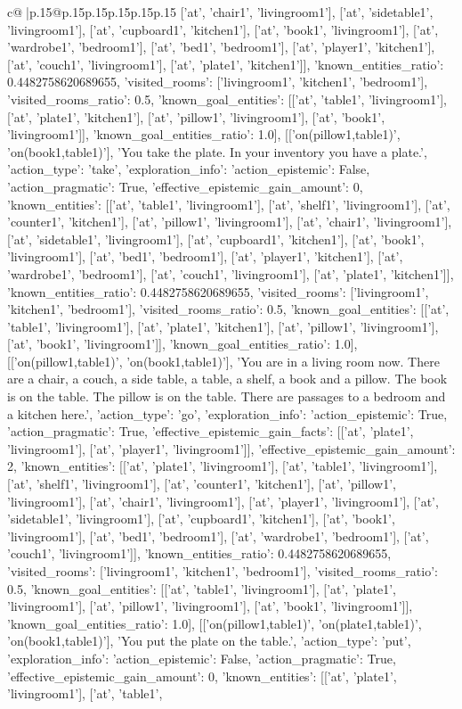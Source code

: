 \documentclass{article}
\begin{document}
{\begin{supertabular}{c@{$\;$}|p{.15\linewidth}@{}p{.15\linewidth}p{.15\linewidth}p{.15\linewidth}p{.15\linewidth}p{.15\linewidth}}
{{{['at', 'chair1', 'livingroom1'], ['at', 'sidetable1', 'livingroom1'], ['at', 'cupboard1', 'kitchen1'], ['at', 'book1', 'livingroom1'], ['at', 'wardrobe1', 'bedroom1'], ['at', 'bed1', 'bedroom1'], ['at', 'player1', 'kitchen1'], ['at', 'couch1', 'livingroom1'], ['at', 'plate1', 'kitchen1']], 'known_entities_ratio': 0.4482758620689655, 'visited_rooms': ['livingroom1', 'kitchen1', 'bedroom1'], 'visited_rooms_ratio': 0.5, 'known_goal_entities': [['at', 'table1', 'livingroom1'], ['at', 'plate1', 'kitchen1'], ['at', 'pillow1', 'livingroom1'], ['at', 'book1', 'livingroom1']], 'known_goal_entities_ratio': 1.0}}], [['on(pillow1,table1)', 'on(book1,table1)'], 'You take the plate. In your inventory you have a plate.\n', {'action_type': 'take', 'exploration_info': {'action_epistemic': False, 'action_pragmatic': True, 'effective_epistemic_gain_amount': 0, 'known_entities': [['at', 'table1', 'livingroom1'], ['at', 'shelf1', 'livingroom1'], ['at', 'counter1', 'kitchen1'], ['at', 'pillow1', 'livingroom1'], ['at', 'chair1', 'livingroom1'], ['at', 'sidetable1', 'livingroom1'], ['at', 'cupboard1', 'kitchen1'], ['at', 'book1', 'livingroom1'], ['at', 'bed1', 'bedroom1'], ['at', 'player1', 'kitchen1'], ['at', 'wardrobe1', 'bedroom1'], ['at', 'couch1', 'livingroom1'], ['at', 'plate1', 'kitchen1']], 'known_entities_ratio': 0.4482758620689655, 'visited_rooms': ['livingroom1', 'kitchen1', 'bedroom1'], 'visited_rooms_ratio': 0.5, 'known_goal_entities': [['at', 'table1', 'livingroom1'], ['at', 'plate1', 'kitchen1'], ['at', 'pillow1', 'livingroom1'], ['at', 'book1', 'livingroom1']], 'known_goal_entities_ratio': 1.0}}], [['on(pillow1,table1)', 'on(book1,table1)'], 'You are in a living room now. There are a chair, a couch, a side table, a table, a shelf, a book and a pillow. The book is on the table. The pillow is on the table. There are passages to a bedroom and a kitchen here.\n', {'action_type': 'go', 'exploration_info': {'action_epistemic': True, 'action_pragmatic': True, 'effective_epistemic_gain_facts': [['at', 'plate1', 'livingroom1'], ['at', 'player1', 'livingroom1']], 'effective_epistemic_gain_amount': 2, 'known_entities': [['at', 'plate1', 'livingroom1'], ['at', 'table1', 'livingroom1'], ['at', 'shelf1', 'livingroom1'], ['at', 'counter1', 'kitchen1'], ['at', 'pillow1', 'livingroom1'], ['at', 'chair1', 'livingroom1'], ['at', 'player1', 'livingroom1'], ['at', 'sidetable1', 'livingroom1'], ['at', 'cupboard1', 'kitchen1'], ['at', 'book1', 'livingroom1'], ['at', 'bed1', 'bedroom1'], ['at', 'wardrobe1', 'bedroom1'], ['at', 'couch1', 'livingroom1']], 'known_entities_ratio': 0.4482758620689655, 'visited_rooms': ['livingroom1', 'kitchen1', 'bedroom1'], 'visited_rooms_ratio': 0.5, 'known_goal_entities': [['at', 'table1', 'livingroom1'], ['at', 'plate1', 'livingroom1'], ['at', 'pillow1', 'livingroom1'], ['at', 'book1', 'livingroom1']], 'known_goal_entities_ratio': 1.0}}], [['on(pillow1,table1)', 'on(plate1,table1)', 'on(book1,table1)'], 'You put the plate on the table.\n', {'action_type': 'put', 'exploration_info': {'action_epistemic': False, 'action_pragmatic': True, 'effective_epistemic_gain_amount': 0, 'known_entities': [['at', 'plate1', 'livingroom1'], ['at', 'table1', }}}
\end{supertabular}}
\end{document}
